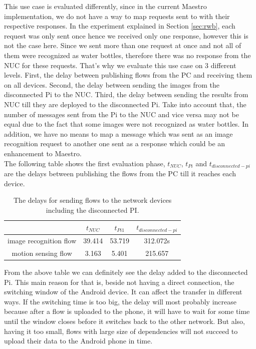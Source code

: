 \noindent This use case is evaluated differently, since in the current Maestro implementation, we do not have a way to map requests sent to with their respective responses. In the experiment explained in Section \ref{sec:rwb}, each request was only sent once hence we received only one response, however this is not the case here. Since we sent more than one request at once and not all of them were recognized as  water bottles, therefore there was no response from the NUC for these requests. That's why we evaluate this use case on 3 different levels. First, the delay between publishing  flows from the PC and receiving them on all devices. Second, the delay between sending the images from the disconnected Pi to the NUC. Third, the delay between sending the results from NUC till they are deployed to the disconnected Pi.  Take into account that, the number of messages sent from the Pi to the NUC and vice versa may not be equal due to the fact that some images were not recognized as water bottles. In addition, we have no means to map a message which was sent as an image recognition request to another one sent as a response which could be an enhancement to Maestro. \\

\noindent The following table shows the first evaluation phase, $t_{NUC}$, $t_{Pi}$ and $t_{disconnected-pi}$ are the delays between publishing the flows from the PC till it reaches each device.
\begin{table}[H]
	\centering
	\begin{tabular}{c|c|c|c}\toprule
		&$t_{NUC}$  & $t_{Pi1}$  & $t_{disconnected-pi}$ \\ \midrule
		image recognition flow& 39.414&	53.719&	312.072s\\
		motion sensing flow&3.163&	5.401&	215.657\\
	\end{tabular}
	\caption{The delays for sending flows to the network devices including the disconnected PI.}
	\label{table:DIS}
\end{table}

\noindent From the above table we can definitely see the delay added to the disconnected Pi. This main reason for that  is, beside not having a direct connection, the switching window of the Android device. It can affect the transfer in different ways. If the switching time is too big, the delay will most probably increase because after a flow is uploaded to the phone, it will have to wait for some time until the window closes before it switches back to the other network. But also, having it too small, flows with  large size of dependencies will not succeed to upload their data to the Android phone in time. \\



